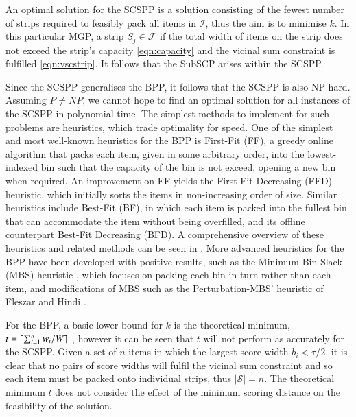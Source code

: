\documentclass{elsarticle}
\begin{document}
\noindent An optimal solution for the SCSPP is a solution consisting of the fewest number of strips required to feasibly pack all items in $\mathcal{I}$, thus the aim is to minimise $k$. In this particular MGP, a strip $S_j \in \mathcal{F}$ if the total width of items on the strip does not exceed the strip's capacity \eqref{eqn:capacity} and the vicinal sum constraint is fulfilled \eqref{eqn:vscstrip}. It follows that the SubSCP arises within the SCSPP.

Since the SCSPP generalises the BPP, it follows that the SCSPP is also NP-hard. Assuming $P \neq NP$, we cannot hope to find an optimal solution for all instances of the SCSPP in polynomial time. The simplest methods to implement for such problems are heuristics, which trade optimality for speed. One of the simplest and most well-known heuristics for the BPP is First-Fit (FF), a greedy online algorithm that packs each item, given in some arbitrary order, into the lowest-indexed bin such that the capacity of the bin is not exceed, opening a new bin when required. An improvement on FF yields the First-Fit Decreasing (FFD) heuristic, which initially sorts the items in non-increasing order of size. Similar heuristics include Best-Fit (BF), in which each item is packed into the fullest bin that can accommodate the item without being overfilled, and its offline counterpart Best-Fit Decreasing (BFD). A comprehensive overview of these heuristics and related methods can be seen in \cite{coffman1984}. More advanced heuristics for the BPP have been developed with positive results, such as the Minimum Bin Slack (MBS) heuristic \cite{gupta1999}, which focuses on packing each bin in turn rather than each item, and modifications of MBS such as the Perturbation-MBS' heuristic of Fleszar and Hindi \cite{fleszar2002}. 

For the BPP, a basic lower bound for $k$ is the theoretical minimum, $t = \lceil\sum_{i=1}^{n} w_i / W\rceil$ \cite{martello1990l}, however it can be seen that $t$ will not perform as accurately for the SCSPP. Given a set of $n$ items in which the largest score width $b_i < \tau / 2$, it is clear that no pairs of score widths will fulfil the vicinal sum constraint and so each item must be packed onto individual strips, thus $|\mathcal{S}| = n$. The theoretical minimum $t$ does not consider the effect of the minimum scoring distance on the feasibility of the solution.
\end{document}
